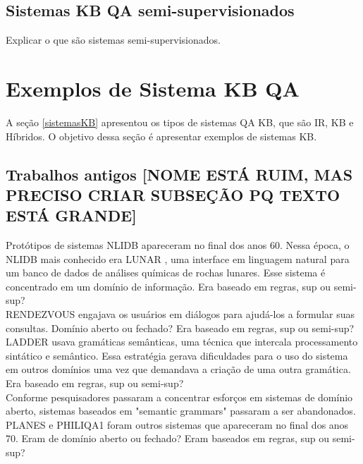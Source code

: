 \documentclass{article}
\begin{document}
\subsection{Sistemas KB QA semi-supervisionados}

Explicar o que são sistemas semi-supervisionados.


\section{Exemplos de Sistema KB QA}

A seção \ref{sistemasKB} apresentou os tipos de sistemas QA KB, que são IR, KB e Híbridos. O objetivo dessa seção é apresentar exemplos de sistemas KB.\\

\subsection{Trabalhos antigos [NOME ESTÁ RUIM, MAS PRECISO CRIAR SUBSEÇÃO PQ TEXTO ESTÁ GRANDE]}

Protótipos de sistemas NLIDB apareceram no final dos anos 60. Nessa época, o NLIDB mais conhecido era LUNAR \citep{woods1973progress}, uma interface em linguagem natural para um banco de dados de análises químicas de rochas lunares. Esse sistema é concentrado em um domínio de informação. Era baseado em regras, sup ou semi-sup?\\

RENDEZVOUS \citep{codd1974seven} engajava os usuários em diálogos para ajudá-los a formular suas consultas. Domínio aberto ou fechado? Era baseado em regras, sup ou semi-sup?\\

LADDER \citep{hendrix1978developing} usava gramáticas semânticas, uma técnica que intercala processamento sintático e semântico. Essa estratégia gerava dificuldades para o uso do sistema em outros domínios uma vez que demandava a criação de uma outra gramática. Era baseado em regras, sup ou semi-sup?\\

Conforme pesquisadores passaram a concentrar esforços em sistemas de domínio aberto, sistemas baseados em "semantic grammars" passaram a ser abandonados. PLANES \citep{waltz1978english} e PHILIQA1 \citep{scha1977philips} foram outros sistemas que apareceram no final dos anos 70. Eram de domínio aberto ou fechado? Eram baseados em regras, sup ou semi-sup?\\
\end{document}
